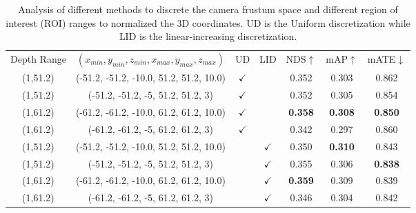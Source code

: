 \documentclass[runningheads]{llncs}
\begin{document}
\setlength{\tabcolsep}{2.5pt}
\begin{table}[t!]
\begin{center}
\caption{Analysis of different methods to discrete the camera frustum space and different region of interest (ROI) ranges to normalized the 3D coordinates. UD is the Uniform discretization while LID is the linear-increasing discretization.}
\label{table:lid}
\begin{tabular}{c|c|c|c|ccc}
\hline\noalign{\smallskip}
Depth Range & $(x_{min},y_{min},z_{min},x_{max},y_{max},z_{max})$ & UD & LID  & NDS$\uparrow$ & mAP$\uparrow$ & mATE$\downarrow$\\
\noalign{\smallskip}
\hline
\noalign{\smallskip}
(1,51.2)&(-51.2, -51.2, -10.0, 51.2, 51.2, 10.0)&$\checkmark$ &  &0.352 &0.303 &0.862\\
(1,51.2)&(-51.2, -51.2, -5, 51.2, 51.2, 3) &$\checkmark$ &  &0.352 &0.305 &0.854\\
(1,61.2)&(-61.2, -61.2, -10.0, 61.2, 61.2, 10.0) &$\checkmark$ & &\textbf{0.358} &\textbf{0.308}  &\textbf{0.850}\\
(1,61.2)&(-61.2, -61.2, -5, 61.2, 61.2, 3) &$\checkmark$ &  &0.342 &0.297 &0.860\\
\hline
(1,51.2)&(-51.2, -51.2, -10.0, 51.2, 51.2, 10.0)& &$\checkmark$ &0.350 &\textbf{0.310} &0.843\\
(1,51.2)&(-51.2, -51.2, -5, 51.2, 51.2, 3) & &$\checkmark$ &0.355 &0.306 &\textbf{0.838}\\
(1,61.2)&(-61.2, -61.2, -10.0, 61.2, 61.2, 10.0) &&$\checkmark$ &\textbf{0.359} & 0.309 &0.839\\
(1,61.2)&(-61.2, -61.2, -5, 61.2, 61.2, 3) & &$\checkmark$ &0.346 &0.304 &0.842\\
\hline
\end{tabular}
\end{center}
\end{table}
\setlength{\tabcolsep}{1.4pt}
\end{document}
